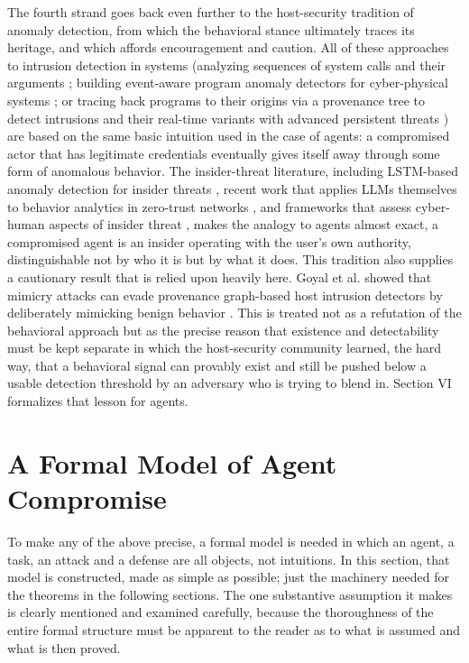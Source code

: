 \documentclass[journal]{IEEEtran}
\theoremstyle{remark}
\begin{document}
The fourth strand goes back even further to the host-security tradition of anomaly detection, from which the behavioral stance ultimately traces its heritage, and which affords encouragement and caution. All of these approaches to intrusion detection in systems (analyzing sequences of system calls and their arguments \cite{r21}; building event-aware program anomaly detectors for cyber-physical systems \cite{r24}; or tracing back programs to their origins via a provenance tree to detect intrusions and their real-time variants with advanced persistent threats \cite{r23,r27}) are based on the same basic intuition used in the case of agents: a compromised actor that has legitimate credentials eventually gives itself away through some form of anomalous behavior. The insider-threat literature, including LSTM-based anomaly detection for insider threats \cite{r22}, recent work that applies LLMs themselves to behavior analytics in zero-trust networks \cite{r18}, and frameworks that assess cyber-human aspects of insider threat \cite{r27}, makes the analogy to agents almost exact, a compromised agent is an insider operating with the user's own authority, distinguishable not by who it is but by what it does. This tradition also supplies a cautionary result that is relied upon heavily here. Goyal et al. showed that mimicry attacks can evade provenance graph-based host intrusion detectors by deliberately mimicking benign behavior \cite{r30}. This is treated not as a refutation of the behavioral approach but as the precise reason that existence and detectability must be kept separate in which the host-security community learned, the hard way, that a behavioral signal can provably exist and still be pushed below a usable detection threshold by an adversary who is trying to blend in. Section VI formalizes that lesson for agents.

\section{A Formal Model of Agent Compromise}

To make any of the above precise, a formal model is needed in which an agent, a task, an attack and a defense are all objects, not intuitions. In this section, that model is constructed, made as simple as possible; just the machinery needed for the theorems in the following sections. The one substantive assumption it makes is clearly mentioned and examined carefully, because the thoroughness of the entire formal structure must be apparent to the reader as to what is assumed and what is then proved.
\end{document}
